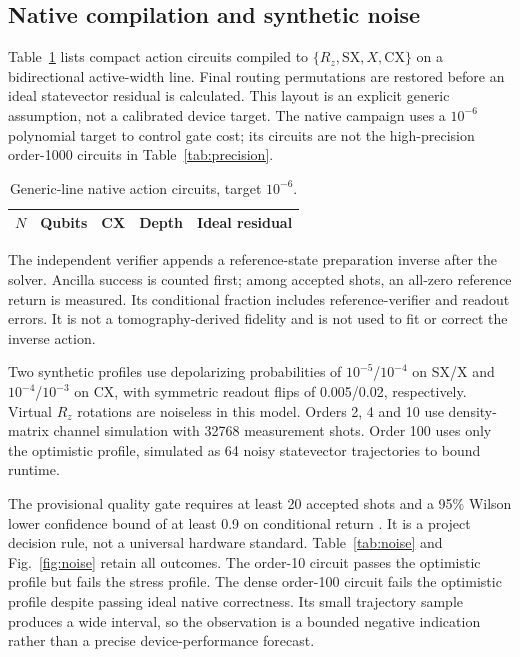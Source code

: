 \documentclass[journal]{IEEEtran}
\begin{document}
\subsection{Native compilation and synthetic noise}
Table~\ref{tab:native} lists compact action circuits compiled to
$\{R_z,\mathrm{SX},X,\mathrm{CX}\}$ on a bidirectional active-width line.
Final routing permutations are restored before an ideal statevector
residual is calculated. This layout is an explicit generic assumption,
not a calibrated device target. The native campaign uses a $10^{-6}$
polynomial target to control gate cost; its circuits are not the
high-precision order-1000 circuits in Table~\ref{tab:precision}.

\begin{table}[t]\caption{Generic-line native action circuits, target $10^{-6}$.}
\label{tab:native}\centering\footnotesize
\begin{tabular}{rrrrr}\toprule
$N$ & Qubits & CX & Depth & Ideal residual\\\midrule
 
\bottomrule\end{tabular}
\end{table}

The independent verifier appends a reference-state preparation inverse
after the solver. Ancilla success is counted first; among accepted shots,
an all-zero reference return is measured. Its conditional fraction includes
reference-verifier and readout errors. It is not a tomography-derived
fidelity and is not used to fit or correct the inverse action.

Two synthetic profiles use depolarizing probabilities of $10^{-5}$/$10^{-4}$
on SX/X and $10^{-4}$/$10^{-3}$ on CX, with symmetric readout flips of
0.005/0.02, respectively. Virtual $R_z$ rotations are noiseless in this
model. Orders 2, 4 and 10 use density-matrix channel simulation with 32768
measurement shots. Order 100 uses only the optimistic profile, simulated
as 64 noisy statevector trajectories to bound runtime.

The provisional quality gate requires at least 20 accepted shots and a
95\% Wilson lower confidence bound of at least 0.9 on conditional return
\cite{wilson1927}. It is a project decision rule, not a universal hardware
standard. Table~\ref{tab:noise} and Fig.~\ref{fig:noise} retain all outcomes.
The order-10 circuit passes the optimistic profile but fails the stress
profile. The dense order-100 circuit fails the optimistic profile despite
passing ideal native correctness. Its small trajectory sample produces a
wide interval, so the observation is a bounded negative indication rather
than a precise device-performance forecast.
\end{document}
